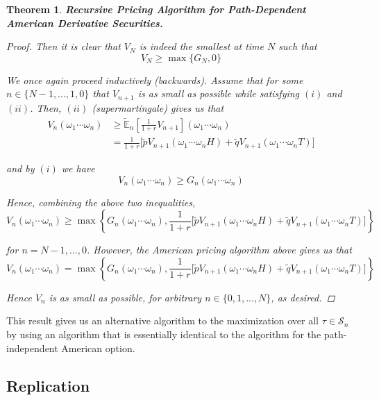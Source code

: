 \documentclass[12pt]{article}
\newtheorem{theorem}{Theorem}
\newlength\tindent
\renewcommand{\indent}{\hspace*{\tindent}}
\newcommand{\E}{\mathbb E}
\begin{document}
\begin{theorem} {\bf Recursive Pricing Algorithm for Path-Dependent American Derivative Securities.}
\begin{proof}
Then it is clear that $V_N$ is indeed the smallest at time $N$ such that
\begin{equation*}
	V_N \geq \max \{G_N, 0\}
\end{equation*}

We once again proceed inductively (backwards). Assume that for some $n \in \{N - 1, ..., 1, 0\}$ that $V_{n + 1}$ is as small as possible while satisfying $(i)$ and $(ii)$. Then, $(ii)$ (supermartingale) gives us that 
\begin{align*}
	V_n(\omega_1\cdots\omega_n) &\geq \tilde{\E}_n \left[ \frac{1}{1 + r}V_{n + 1}\right](\omega_1\cdots\omega_n) \\
	&= \frac{1}{1 + r} \Big[\tilde{p}V_{n + 1}(\omega_1\cdots\omega_nH) + \tilde{q}V_{n + 1}(\omega_1\cdots\omega_nT) \Big] 
\end{align*}

and by $(i)$ we have
\begin{equation*}
	V_n(\omega_1\cdots\omega_n) \geq G_n(\omega_1\cdots\omega_n)
\end{equation*}

Hence, combining the above two inequalities,
\begin{equation*}
	V_n(\omega_1\cdots\omega_n) \geq \max \left\{ G_n(\omega_1\cdots\omega_n), \frac{1}{1 + r} \Big[\tilde{p}V_{n + 1}(\omega_1\cdots\omega_nH) + \tilde{q}V_{n + 1}(\omega_1\cdots\omega_nT) \Big] \right\}
\end{equation*}

for $n = N - 1,..., 0$. However, the American pricing algorithm above gives us that
\begin{equation*}
	V_n(\omega_1\cdots\omega_n) = \max \left\{ G_n(\omega_1\cdots\omega_n), \frac{1}{1 + r} \Big[\tilde{p}V_{n + 1}(\omega_1\cdots\omega_nH) + \tilde{q}V_{n + 1}(\omega_1\cdots\omega_nT) \Big] \right\}
\end{equation*}

Hence $V_n$ is as small as possible, for arbitrary $n \in \{0, 1,..., N\}$, as desired.
\end{proof}
\end{theorem}

\indent This result gives us an alternative algorithm to the maximization over all $\tau\in\mathcal S_n$ by using an algorithm that is essentially identical to the algorithm for the path-independent American option.

\subsection{Replication}
\end{document}
